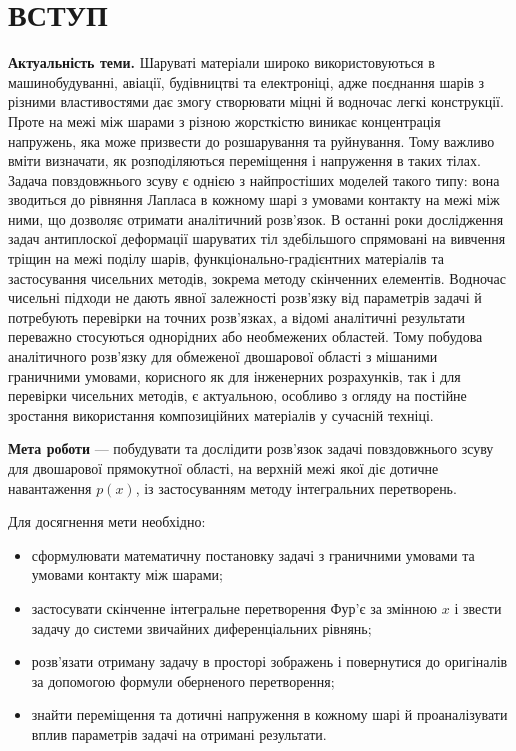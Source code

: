 
\setcounter{secnumdepth}{-1} %
\chapter{ВСТУП}             %
\setcounter{secnumdepth}{2}  %

\textbf{Актуальність теми.} Шаруваті матеріали широко використовуються в машинобудуванні, авіації, будівництві та електроніці, адже поєднання шарів з різними властивостями дає змогу створювати міцні й водночас легкі конструкції. Проте на межі між шарами з різною жорсткістю виникає концентрація напружень, яка може призвести до розшарування та руйнування. Тому важливо вміти визначати, як розподіляються переміщення і напруження в таких тілах. Задача повздовжнього зсуву є однією з найпростіших моделей такого типу: вона зводиться до рівняння Лапласа в кожному шарі з умовами контакту на межі між ними, що дозволяє отримати аналітичний розв’язок. В останні роки дослідження задач антиплоскої деформації шаруватих тіл здебільшого спрямовані на вивчення тріщин на межі поділу шарів, функціонально-градієнтних матеріалів та застосування чисельних методів, зокрема методу скінченних елементів. Водночас чисельні підходи не дають явної залежності розв’язку від параметрів задачі й потребують перевірки на точних розв’язках, а відомі аналітичні результати переважно стосуються однорідних або необмежених областей. Тому побудова аналітичного розв’язку для обмеженої двошарової області з мішаними граничними умовами, корисного як для інженерних розрахунків, так і для перевірки чисельних методів, є актуальною, особливо з огляду на постійне зростання використання композиційних матеріалів у сучасній техніці.

\textbf{Мета роботи} — побудувати та дослідити розв’язок задачі повздовжнього зсуву для двошарової прямокутної області, на верхній межі якої діє дотичне навантаження $p(x)$, із застосуванням методу інтегральних перетворень.

Для досягнення мети необхідно:
\begin{itemize}
	\item сформулювати математичну постановку задачі з граничними умовами та умовами контакту між шарами;
	\item застосувати скінченне інтегральне перетворення Фур’є за змінною $x$ і звести задачу до системи звичайних диференціальних рівнянь;
	\item розв’язати отриману задачу в просторі зображень і повернутися до оригіналів за допомогою формули оберненого перетворення;
	\item знайти переміщення та дотичні напруження в кожному шарі й проаналізувати вплив параметрів задачі на отримані результати.
\end{itemize}

